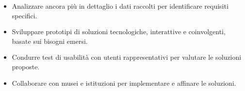 \documentclass{article}
\begin{document}
\begin{itemize}
    \item Analizzare ancora più in dettaglio i dati raccolti per identificare requisiti specifici.
    \item Sviluppare prototipi di soluzioni tecnologiche, interattive e coinvolgenti, basate sui bisogni emersi.
    \item Condurre test di usabilità con utenti rappresentativi per valutare le soluzioni proposte.
    \item Collaborare con musei e istituzioni per implementare e affinare le soluzioni.
\end{itemize}
\end{document}
